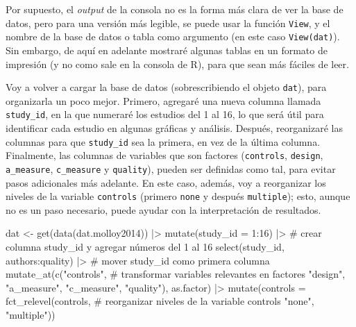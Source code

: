 \documentclass[
  bookmarksnumbered]{article}
\newenvironment{Shaded}{\begin{snugshade}}{\end{snugshade}}
\newcommand{\AttributeTok}[1]{\textcolor[rgb]{0.00,0.34,0.68}{#1}}
\newcommand{\CommentTok}[1]{\textcolor[rgb]{0.54,0.53,0.53}{#1}}
\newcommand{\DecValTok}[1]{\textcolor[rgb]{0.69,0.50,0.00}{#1}}
\newcommand{\FunctionTok}[1]{\textcolor[rgb]{0.39,0.29,0.61}{#1}}
\newcommand{\NormalTok}[1]{\textcolor[rgb]{0.12,0.11,0.11}{#1}}
\newcommand{\OtherTok}[1]{\textcolor[rgb]{0.00,0.43,0.16}{#1}}
\newcommand{\SpecialCharTok}[1]{\textcolor[rgb]{0.24,0.68,0.91}{#1}}
\newcommand{\StringTok}[1]{\textcolor[rgb]{0.75,0.01,0.01}{#1}}
\begin{document}
Por supuesto, el \emph{output} de la consola no es la forma más clara de ver la base de datos, pero para una versión más legible, se puede usar la función \texttt{View}, y el nombre de la base de datos o tabla como argumento (en este caso \texttt{View(dat)}). Sin embargo, de aquí en adelante mostraré algunas tablas en un formato de impresión (y no como sale en la consola de R), para que sean más fáciles de leer.

Voy a volver a cargar la base de datos (sobrescribiendo el objeto \texttt{dat}), para organizarla un poco mejor. Primero, agregaré una nueva columna llamada \texttt{study\_id}, en la que numeraré los estudios del 1 al 16, lo que será útil para identificar cada estudio en algunas gráficas y análisis. Después, reorganizaré las columnas para que \texttt{study\_id} sea la primera, en vez de la última columna. Finalmente, las columnas de variables que son factores (\texttt{controls}, \texttt{design}, \texttt{a\_measure}, \texttt{c\_measure} y \texttt{quality}), pueden ser definidas como tal, para evitar pasos adicionales más adelante. En este caso, además, voy a reorganizar los niveles de la variable \texttt{controls} (primero \texttt{none} y después \texttt{multiple}); esto, aunque no es un paso necesario, puede ayudar con la interpretación de resultados.

\begin{Shaded}
\begin{Highlighting}[]
\NormalTok{dat }\OtherTok{\textless{}{-}} \FunctionTok{get}\NormalTok{(}\FunctionTok{data}\NormalTok{(dat.molloy2014)) }\SpecialCharTok{|\textgreater{}}
  \FunctionTok{mutate}\NormalTok{(}\AttributeTok{study\_id =} \DecValTok{1}\SpecialCharTok{:}\DecValTok{16}\NormalTok{)  }\SpecialCharTok{|\textgreater{}} \CommentTok{\# crear columna \textquotesingle{}study\_id\textquotesingle{} y agregar números del 1 al 16}
  \FunctionTok{select}\NormalTok{(study\_id, authors}\SpecialCharTok{:}\NormalTok{quality) }\SpecialCharTok{|\textgreater{}} \CommentTok{\# mover \textquotesingle{}study\_id\textquotesingle{} como primera columna}
  \FunctionTok{mutate\_at}\NormalTok{(}\FunctionTok{c}\NormalTok{(}\StringTok{"controls"}\NormalTok{, }\CommentTok{\# transformar variables relevantes en factores}
              \StringTok{"design"}\NormalTok{,}
              \StringTok{"a\_measure"}\NormalTok{,}
              \StringTok{"c\_measure"}\NormalTok{,}
              \StringTok{"quality"}\NormalTok{), }
\NormalTok{            as.factor) }\SpecialCharTok{|\textgreater{}} 
  \FunctionTok{mutate}\NormalTok{(}\AttributeTok{controls =} \FunctionTok{fct\_relevel}\NormalTok{(controls, }\CommentTok{\# reorganizar niveles de la variable \textquotesingle{}controls\textquotesingle{}}
                                \StringTok{"none"}\NormalTok{, }\StringTok{"multiple"}\NormalTok{))  }
\end{Highlighting}
\end{Shaded}
\end{document}
